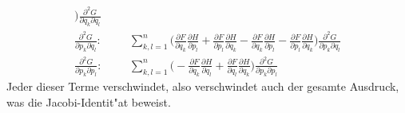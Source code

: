 \begin{loesung}
\begin{align*}
\biggr)
\frac{\partial^2 G}{\partial q_k\partial q_l}
\\
\frac{\partial^2 G}{\partial p_k\partial q_l}:&
&&
\sum_{k,l=1}^n
\biggl(
\frac{\partial F}{\partial q_k}\frac{\partial H}{\partial p_l}
+
\frac{\partial F}{\partial p_l}\frac{\partial H}{\partial q_k}
-
\frac{\partial F}{\partial q_k}\frac{\partial H}{\partial p_l}
-
\frac{\partial F}{\partial p_l}\frac{\partial H}{\partial q_k}
\biggr)
\frac{\partial ^2G}{\partial p_k\partial q_l}
\\
\frac{\partial^2 G}{\partial p_k\partial p_l}:&
&&
\sum_{k,l=1}^n
\biggl(
-\frac{\partial F}{\partial q_k}\frac{\partial H}{\partial q_l}
+
\frac{\partial F}{\partial q_l}\frac{\partial H}{\partial q_k}
\biggr)
\frac{\partial^2 G}{\partial p_k\partial p_l}
\end{align*}
Jeder dieser Terme verschwindet, also verschwindet auch der gesamte
Ausdruck, was die Jacobi-Identit"at beweist.
\end{loesung}

